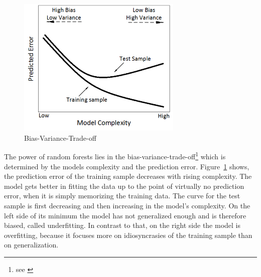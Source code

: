 \documentclass[12pt, a4paper]{scrartcl}
\theoremstyle{definition}
\begin{document}
\begin{figure}[!ht]
	\centering
	\includegraphics[width=0.7\textwidth]{graphics/biasvariancetradeoff.png}
	\caption{Bias-Variance-Trade-off}
	\label{fig:biasvariancetradeoff}
\end{figure}

The power of random forests lies in the bias-variance-trade-off\footnote{see
\citet[Chapter 2]{friedman2009elements}} which is determined by the models
complexity and the prediction error. Figure~\ref{fig:biasvariancetradeoff}
shows, the prediction error of the training sample decreases with rising
complexity. The model gets better in fitting the data up to the point of
virtually no prediction error, when it is simply memorizing the training data.
The curve for the test sample is first decreasing and then increasing in the
model's complexity. On the left side of its minimum the model has not
generalized enough and is therefore biased, called underfitting. In contrast to
that, on the right side the model is overfitting, because it focuses more on
idiosyncrasies of the training sample than on generalization.

\end{document}
